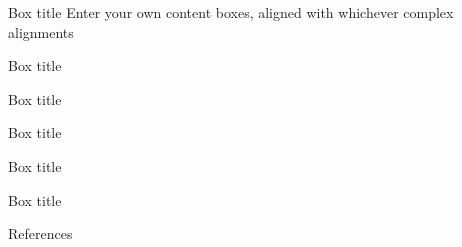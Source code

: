 \documentclass[
    a0paper, %
    landscape, %
    fontscale=0.3 %
    ]{baposter}
\begin{document}
\begin{poster}
\begin{posterbox}[
    name = box1,  %
    column = 0, %
    ]{Box title}
    Enter your own content boxes, aligned with whichever complex alignments
\end{posterbox}


\begin{posterbox}[
    name = box2,  %
    column = 0, %
    below = box1, %
    ]{Box title}
    \lipsum[1]
\end{posterbox}


\begin{posterbox}[
    name = box3,  %
    column = 0, %
    below = box2, %
    ]{Box title}
    \lipsum[1]
\end{posterbox}


\begin{posterbox}[
    name = box4,  %
    column = 1, %
    span = 3, %
    ]{Box title}
    \lipsum[1]
\end{posterbox}


\begin{posterbox}[
    name = box5,  %
    column = 1, %
    below = box4, %
    ]{Box title}
    \lipsum[1]
\end{posterbox}


\begin{posterbox}[
    name = box6,  %
    column = 2, %
    span = 2, %
    below = box4, %
    bottomaligned = box5, %
    ]{Box title}
    \lipsum[1]
\end{posterbox}


\begin{posterbox}[
    name = references,  %
    column = 3, %
    below = box6, %
    ]{References}
    \renewcommand{\section}[2]{} %
    \nocite{*} %
    
    
\end{posterbox}

\end{poster}
\end{document}
